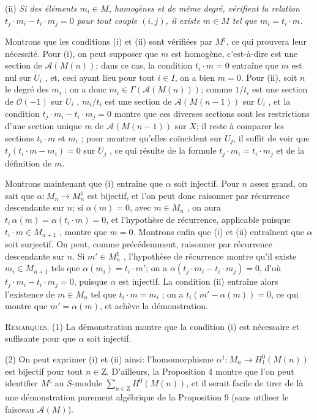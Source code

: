 (ii) \textit{Si des éléments $m_i \in M$, homogènes et de même degré, vérifient la relation $t_j\cdot m_i - t_i\cdot m_j = 0$ pour tout couple $(i, j)$, il existe $m \in M$ tel que $m_i = t_i\cdot m$.}

Montrons que les conditions (i) et (ii) sont vérifiées par $M^\natural$, ce qui prouvera leur nécessité. Pour (i), on peut supposer que $m$ est homogène, c'est-à-dire est une section de $\mathcal{A}(M(n))$; dans ce cas, la condition $t_i\cdot m = 0$ entraîne que $m$ est nul sur $U_i$ , et, ceci ayant lieu pour tout $i \in I$, on a bien $m = 0$. Pour (ii), soit $n$ le degré des $m_i$ ; on a donc $m_i \in \Gamma(\mathcal{A}(M(n)))$; comme $1/t_i$ est une section de $\mathcal{O}(-1)$ sur $U_i$ , $m_i/t_i$ est une section de $\mathcal{A}(M(n - 1))$ sur $U_i$ , et la condition $t_j\cdot m_i - t_i\cdot m_j = 0$ montre que ces diverses sections sont les restrictions d'une section unique $m$ de $\mathcal{A}(M(n - 1))$ sur $X$; il reste à comparer les sections $t_i\cdot m$ et $m_i$ ; pour montrer qu'elles coïncident sur $U_j$, il suffit de voir que $t_j(t_i\cdot m - m_i) = 0$ sur $U_j$ , ce qui résulte de la formule $t_j\cdot m_i = t_i\cdot m_j$ et de la définition de $m$.

Montrons maintenant que (i) entraîne que $\alpha$ soit injectif. Pour $n$ assez grand, on sait que $\alpha : M_n \to M_n^\natural$ est bijectif, et l'on peut donc raisonner par récurrence descendante sur $n$; si $\alpha(m) = 0$, avec $m \in M_n$ , on aura $t_i\,\alpha(m) = \alpha(t_i\cdot m) = 0$, et l'hypothèse de récurrence, applicable puisque $t_i\cdot m \in M_{n+1}$ , montre que $m = 0$. Montrons enfin que (i) et (ii) entraînent que $\alpha$ soit surjectif. On peut, comme précédemment, raisonner par récurrence descendante sur $n$. Si $m' \in M_n^\natural$ , l'hypothèse de récurrence montre qu'il existe $m_i \in M_{n+1}$ tels que $\alpha(m_i) = t_i\cdot m'$; on a $\alpha(t_j\cdot m_i - t_i\cdot m_j) = 0$, d'où $t_j\cdot m_i - t_i\cdot m_j = 0$, puisque $\alpha$ est injectif. La condition (ii) entraîne alors l'existence de $m \in M_n$ tel que $t_i\cdot m = m_i$ ; on a $t_i(m' - \alpha(m)) = 0$, ce qui montre que $m' = \alpha(m)$, et achève la démonstration.

\textsc{Remarques}. (1) La démonstration montre que la condition (i) est nécessaire et suffisante pour que $\alpha$ soit injectif.

(2) On peut exprimer (i) et (ii) ainsi: l'homomorphisme $\alpha^1 : M_n \to H^0_1(M(n))$ est bijectif pour tout $n \in \mathrm{Z}$. D'ailleurs, la Proposition 4 montre que l'on peut identifier $M^\natural$ au $S$-module $\sum_{n \in \mathrm{Z}} H^0(M(n))$, et il serait facile de tirer de là
une démonstration purement algébrique de la Proposition 9 (sans utiliser le faisceau $\mathcal{A}(M)$).


